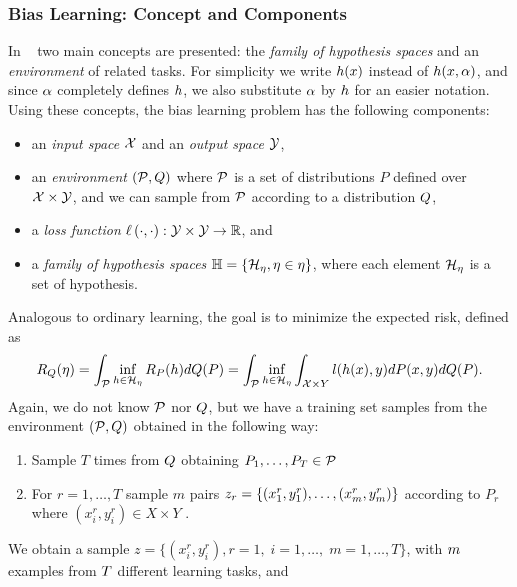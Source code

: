 \subsubsection*{Bias Learning: Concept and Components}
In ~\cite{baxter2000model} two main concepts are presented: the \emph{family of hypothesis spaces} and an \emph{environment} of related tasks. 
For simplicity we write $h(x)$  instead of $h(x, \alpha)$, and since $\alpha$ completely defines $h$, we also substitute $\alpha$ by $h$ for an easier notation.
Using these concepts, the bias learning problem has the following components:
\begin{itemize}
    \item an \emph{input space} $\mathcal{X}$ and an \emph{output space} $\mathcal{Y}$,
    \item an \emph{environment} $(\mathcal{P}, Q)$ where $\mathcal{P}$ is a set of distributions $P$ defined over $\mathcal{X} \times \mathcal{Y}$, and we can sample from $\mathcal{P}$ according to a distribution $Q$,
    \item a \emph{loss function} $\ell\left( \cdot, \cdot\right):\mathcal{Y} \times \mathcal{Y} \to \mathbb{R}$, and
    \item a \emph{family of hypothesis spaces} $\mathbb{H} = \left\{\mathcal{H}_\eta, \eta \in \eta\right\}$, where each element $\mathcal{H}_\eta$ is a set of hypothesis.
\end{itemize}
Analogous to ordinary learning, the goal is to minimize the expected risk, defined as
\begin{equation}\label{eq:biaslearn_exprisk}
    \bexprisk(\eta) = \int_{\bprobspace} \inf_{\hypf \in \hypspace_\eta} \risk_P(\hypf) d\bdistf(P) = \int_{\bprobspace} \inf_{\hypf \in \hypspace_\eta} \int_{\Xspace \times Y} l(h(x), y) dP(x, y) d\bdistf(P).
\end{equation}
Again, we do not know $\mathcal{P}$ nor $Q$, but we have a training set samples from the environment $(\mathcal{P}, Q)$ obtained in the following way:
\begin{enumerate}
    \item Sample $T$ times from $Q$ obtaining $P_1, \ldots, P_T \in \mathcal{P}$
    \item For $r=1, \ldots, T$ sample $m$ pairs $z_r = \{(x_1^r, y_1^r), \ldots, (x_m^r, y_m^r)\}$ according to $P_r$ where $(x_i^r, y_i^r) \in X \times Y$ .
\end{enumerate}
We obtain a sample $z=\{(x_i^r, y_i^r), r=1,\; i=1, \ldots, \;m=1, \ldots, T\}$, with $m$ examples from $T$ different learning tasks, and
